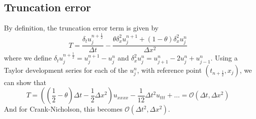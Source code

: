 \documentclass[12pt, openany]{report}
\theoremstyle{definition}
\begin{document}
\subsection{Truncation error}
By definition, the truncation error term is given by
\begin{equation}
	T = \frac{\delta_t u_j^{n+\frac{1}{2}}}{\Delta t} - \frac{\theta \delta_x^2u_j^{n+1} + (1-\theta)\delta_x^2u_j^n}{\Delta x^2}
\end{equation}
where we define $\delta_tu_j^{n+\frac{1}{2}}=u_j^{n+1}-u_j^n$ and $\delta_x^2u_j^n = u_{j+1}^n - 2 u_j^n + u_{j-1}^n$. Using a Taylor development series for each of the $u_j^n$, with reference point $(t_{n+\frac{1}{2}}, x_j)$, we can show that 
\begin{equation}
	T = \left(\left(\frac{1}{2}-\theta\right)\Delta t-\frac{1}{2}\Delta x^2\right) u_{xxxx} -\frac{1}{12}\Delta t^2u_{ttt} + \dots = \mathcal{O}(\Delta t, \Delta x^2)
\end{equation}
And for Crank-Nicholson, this becomes $\mathcal{O}(\Delta t^2, \Delta x^2)$. 
\end{document}
